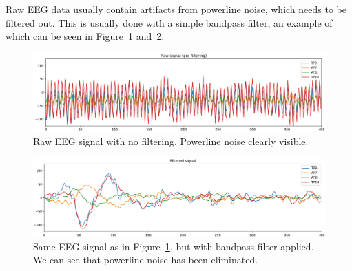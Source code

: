 
    Raw EEG data usually contain artifacts from powerline noise, which needs to be filtered out. This is usually done with a simple bandpass filter, an example of which can be seen in Figure~\ref{fig:signal-unfiltered} and~\ref{fig:signal-filtered}.
    
    \begin{figure}[H]
        \includegraphics[width=14cm]{img/raw-signal-prefilter.png}
        \caption{Raw EEG signal with no filtering. Powerline noise clearly visible.}\label{fig:signal-unfiltered}
    \end{figure}

    \begin{figure}[H]
        \includegraphics[width=14cm]{img/raw-signal-postfilter.png}
        \caption{Same EEG signal as in Figure~\ref{fig:signal-unfiltered}, but with bandpass filter applied. We can see that powerline noise has been eliminated.}\label{fig:signal-filtered}
    \end{figure}


